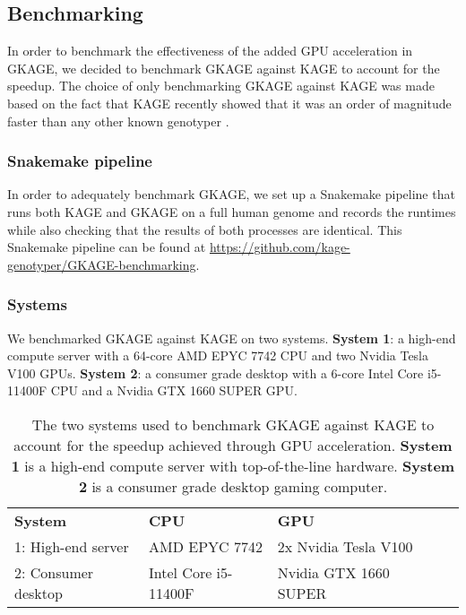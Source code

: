 \subsection{Benchmarking} \label{results:benchmarking}
In order to benchmark the effectiveness of the added GPU acceleration in GKAGE, we decided to benchmark GKAGE against KAGE to account for the speedup.
The choice of only benchmarking GKAGE against KAGE was made based on the fact that KAGE recently showed that it was an order of magnitude faster than any other known genotyper \cite{kage}.

\subsubsection{Snakemake pipeline}
In order to adequately benchmark GKAGE, we set up a Snakemake pipeline that runs both KAGE and GKAGE on a full human genome and records the runtimes while also checking that the results of both processes are identical.
This Snakemake pipeline can be found at \url{https://github.com/kage-genotyper/GKAGE-benchmarking}.

\subsubsection{Systems}
We benchmarked GKAGE against KAGE on two systems.
\textbf{System 1}: a high-end compute server with a 64-core AMD EPYC 7742 CPU and two Nvidia Tesla V100 GPUs.
\textbf{System 2}: a consumer grade desktop with a 6-core Intel Core i5-11400F CPU and a Nvidia GTX 1660 SUPER GPU.

\vspace{1em}
\begin{table}[H]
\begin{center}
\begin{tabular}{lllll}
\multicolumn{1}{l|}{\textbf{System}} & \multicolumn{1}{l}{\textbf{CPU}}                  & \multicolumn{1}{l}{\textbf{GPU}}                   &  \\ \cline{1-3}
\multicolumn{1}{l|}{1: High-end server} & \multicolumn{1}{l}{AMD EPYC 7742}        & \multicolumn{1}{l}{2x Nvidia Tesla V100}     &  \\ 
\multicolumn{1}{l|}{2: Consumer desktop} & \multicolumn{1}{l}{Intel Core i5-11400F} & \multicolumn{1}{l}{Nvidia GTX 1660 SUPER} &  \\
\end{tabular}
\end{center}
\caption{
  The two systems used to benchmark GKAGE against KAGE to account for the speedup achieved through GPU acceleration.
  \textbf{System 1} is a high-end compute server with top-of-the-line hardware.
  \textbf{System 2} is a consumer grade desktop gaming computer.
}
\label{results:gkage:tables:systems}
\end{table}

